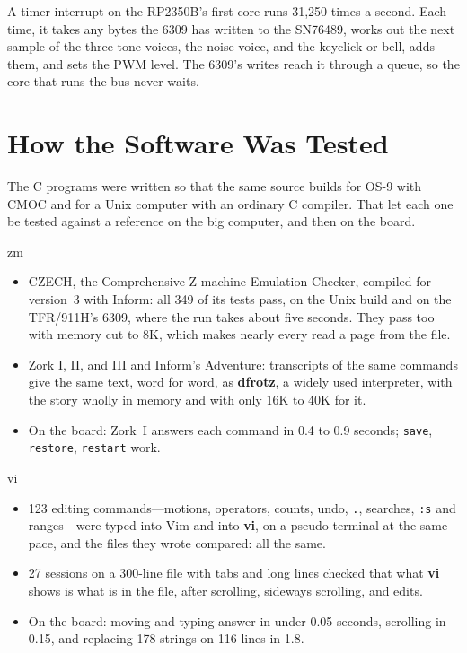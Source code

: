 \documentclass[10pt,twoside,openany]{book}
\makeatletter
\newcommand{\cmd}[1]{\textbf{#1}}            %
\newcommand{\thesectname}{}
\newcommand{\chapterpages}{%
  \renewcommand{\thepage}{\thechapter--\arabic{page}}\setcounter{page}{1}}
\renewcommand{\section}{\@startsection{section}{1}{0pt}{3.2ex plus 1ex}{1.2ex}%
  {\sffamily\bfseries\large}}
\makeatother
\begin{document}
A timer interrupt on the RP2350B's first core runs 31,250 times a second.
Each time, it takes any bytes the 6309 has written to the SN76489, works
out the next sample of the three tone voices, the noise voice, and the
keyclick or bell, adds them, and sets the PWM level. The 6309's writes
reach it through a queue, so the core that runs the bus never waits.

\chapter{How the Software Was Tested}
\chapterpages
\renewcommand{\thesectname}{How the Software Was Tested}

The C programs were written so that the same source builds for OS-9 with
CMOC and for a Unix computer with an ordinary C compiler. That let each one
be tested against a reference on the big computer, and then on the board.

\section{zm}

\begin{itemize}\setlength{\itemsep}{0.3ex}
\item CZECH, the Comprehensive Z-machine Emulation Checker, compiled for
version~3 with Inform: all 349 of its tests pass, on the Unix build and on
the TFR/911H's 6309, where the run takes about five seconds. They pass
too with memory cut to 8K, which makes nearly every read a page from the
file.
\item Zork I, II, and III and Inform's Adventure: transcripts of
the same commands give the same text, word for word, as \cmd{dfrotz}, a
widely used interpreter, with the story wholly in memory and with only
16K to 40K for it.
\item On the board: Zork~I answers each command in 0.4 to 0.9 seconds;
\texttt{save}, \texttt{restore}, \texttt{restart} work.
\end{itemize}

\section{vi}

\begin{itemize}\setlength{\itemsep}{0.3ex}
\item 123 editing commands---motions, operators, counts, undo,
\texttt{.}, searches, \texttt{:s} and ranges---were typed into Vim and
into \cmd{vi}, on a pseudo-terminal at the same pace, and the files they
wrote compared: all the same.
\item 27 sessions on a 300-line file with tabs and long lines checked that
what \cmd{vi} shows is what is in the file, after scrolling, sideways
scrolling, and edits.
\item On the board: moving and typing answer in under 0.05 seconds,
scrolling in 0.15, and replacing 178 strings on 116 lines in 1.8.
\end{itemize}
\end{document}
